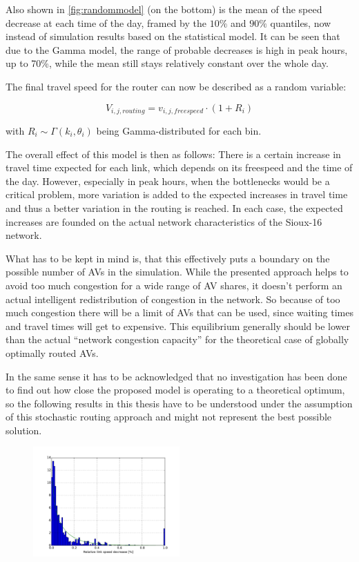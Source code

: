 Also shown in \cref{fig:randommodel} (on the bottom) is the mean of the speed decrease at each time of the
day, framed by the $10\%$ and $90\%$ quantiles, now instead of simulation results based on the statistical model.
It can be seen that due to the Gamma model, the range of probable decreases is high in peak hours, up to 70\%,
while the mean still stays relatively constant over the whole day.

The final travel speed for the router can now be described as a random variable:

\begin{equation}
    V_{i,j,routing} = v_{i,j,freespeed} \cdot (1 + R_i)
\end{equation}

with $R_i \sim \Gamma(k_i, \theta_i)$ being Gamma-distributed for each bin.

The overall effect of this model is then as follows: There is a certain increase
in travel time expected for each link, which depends on its freespeed and the time
of the day. However, especially in peak hours, when the bottlenecks would be a
critical problem, more variation is added to the expected increases in travel time
and thus a better variation in the routing is reached. In each case, the expected
increases are founded on the actual network characteristics of the Sioux-16 network.

What has to be kept in mind is, that this effectively puts a boundary on the
possible number of AVs in the simulation. While the presented approach helps to
avoid too much congestion for a wide range of AV shares, it doesn't perform an
actual intelligent redistribution of congestion in the network. So because of
too much congestion there will be a limit of AVs that can be used, since waiting
times and travel times will get to expensive. This equilibrium generally should
be lower than the actual ``network congestion capacity'' for the theoretical case
of globally optimally routed AVs.

In the same sense it has to be acknowledged that no investigation has been done
to find out how close the proposed model is operating to a theoretical optimum, so
the following results in this thesis have to be understood under the assumption
of this stochastic routing approach and might not represent the best possible
solution.

\begin{figure}
    \centering
    \includegraphics[width=0.5\textwidth]{figures/speeddecdist.pdf}
    \caption{}
    \label{fig:speeddecdist}
\end{figure}

